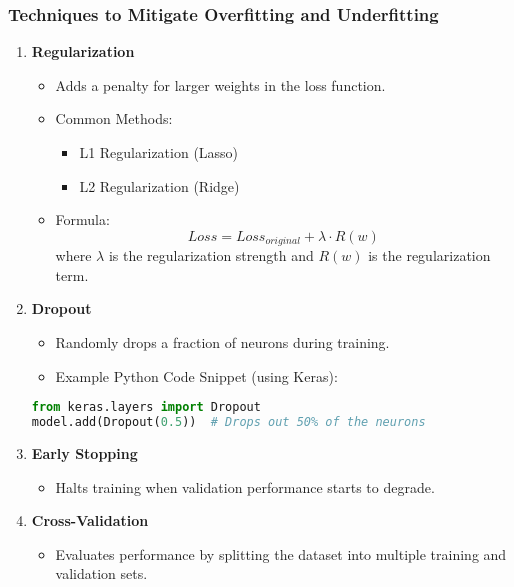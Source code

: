\documentclass[aspectratio=169]{beamer}
\begin{document}
\begin{frame}[fragile]
  \frametitle{Techniques to Mitigate Overfitting and Underfitting}
  \begin{enumerate}
    \item \textbf{Regularization}
      \begin{itemize}
        \item Adds a penalty for larger weights in the loss function.
        \item Common Methods:
          \begin{itemize}
            \item L1 Regularization (Lasso)
            \item L2 Regularization (Ridge)
          \end{itemize}
        \item Formula:
          \begin{equation}
          Loss = Loss_{original} + \lambda \cdot R(w)
          \end{equation}
          where \( \lambda \) is the regularization strength and \( R(w) \) is the regularization term.
      \end{itemize}
    
    \item \textbf{Dropout}
      \begin{itemize}
        \item Randomly drops a fraction of neurons during training.
        \item Example Python Code Snippet (using Keras):
        \end{itemize}
        \begin{lstlisting}[language=Python]
from keras.layers import Dropout
model.add(Dropout(0.5))  # Drops out 50% of the neurons
        \end{lstlisting}

    \item \textbf{Early Stopping}
      \begin{itemize}
        \item Halts training when validation performance starts to degrade.
      \end{itemize}

    \item \textbf{Cross-Validation}
      \begin{itemize}
        \item Evaluates performance by splitting the dataset into multiple training and validation sets.
      \end{itemize}
  \end{enumerate}
\end{frame}
\end{document}
